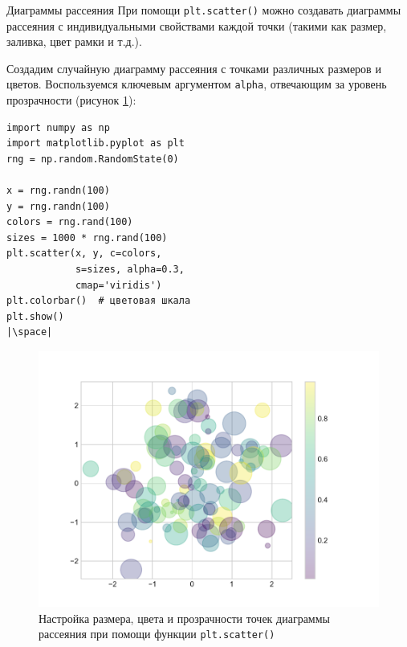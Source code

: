 \documentclass[aspectratio=169, mathserif]{beamer}	%
\begin{document}
\begin{frame}[fragile, label=m]{Диаграммы рассеяния}
\scriptsize
При помощи \texttt{plt.scatter()} можно создавать диаграммы рассеяния с индивидуальными свойствами каждой точки (такими как размер, заливка, цвет рамки и т.д.).

Создадим случайную диаграмму рассеяния с точками различных размеров и цветов. Воспользуемся ключевым аргументом \texttt{alpha}, отвечающим за уровень прозрачности (рисунок \ref{fig:fig_18}):
\vfill
\begin{minipage}{.4\textwidth}
\begin{verbatim}
import numpy as np
import matplotlib.pyplot as plt
rng = np.random.RandomState(0)

x = rng.randn(100)
y = rng.randn(100)
colors = rng.rand(100)
sizes = 1000 * rng.rand(100)
plt.scatter(x, y, c=colors,
            s=sizes, alpha=0.3,
            cmap='viridis')
plt.colorbar()  # цветовая шкала
plt.show()
|\space|
\end{verbatim}
\end{minipage}
\begin{minipage}{.59\textwidth}
\begin{figure}[h!]
	\centering
	\includegraphics[width=.73\linewidth]{./pics/Figure_18}
	\caption{Настройка размера, цвета и прозрачности точек диаграммы рассеяния при помощи функции \texttt{plt.scatter()}}
	\label{fig:fig_18}
\end{figure}
\end{minipage}
\vfill
\end{frame}
\end{document}
